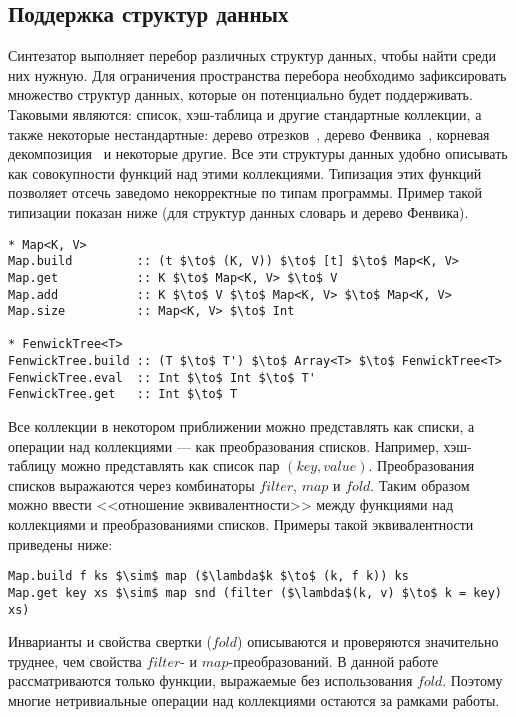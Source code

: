 \documentclass[14pt]{matmex-diploma-custom}
\begin{document}
\subsection{Поддержка структур данных}
Синтезатор выполняет перебор различных структур данных, чтобы найти среди них нужную. Для ограничения пространства перебора необходимо зафиксировать множество структур данных, которые он потенциально будет поддерживать. Таковыми являются: список, хэш-таблица и другие стандартные коллекции, а также некоторые нестандартные: дерево отрезков~\cite{Bentley1977}, дерево Фенвика~\cite{Fenwick}, корневая декомпозиция~\cite{RootDec} и некоторые другие. Все эти структуры данных удобно описывать как совокупности функций над этими коллекциями. Типизация этих функций позволяет отсечь заведомо некорректные по типам программы. Пример такой типизации показан ниже (для структур данных словарь и дерево Фенвика).

\begin{lstlisting}[language=CollectionLang, mathescape=true]
* Map<K, V>
Map.build         :: (t $\to$ (K, V)) $\to$ [t] $\to$ Map<K, V>
Map.get           :: K $\to$ Map<K, V> $\to$ V
Map.add           :: K $\to$ V $\to$ Map<K, V> $\to$ Map<K, V>
Map.size          :: Map<K, V> $\to$ Int

* FenwickTree<T>
FenwickTree.build :: (T $\to$ T') $\to$ Array<T> $\to$ FenwickTree<T> 
FenwickTree.eval  :: Int $\to$ Int $\to$ T'
FenwickTree.get   :: Int $\to$ T
\end{lstlisting}

Все коллекции в некотором приближении можно представлять как списки, а операции над коллекциями --- как преобразования списков. Например, хэш-таблицу можно представлять как список пар $(key, value)$. Преобразования списков выражаются через комбинаторы $filter$, $map$ и $fold$. Таким образом можно ввести <<отношение эквивалентности>> между функциями над коллекциями и преобразованиями списков. Примеры такой эквивалентности приведены ниже:
\begin{lstlisting}[language=CollectionLang, mathescape=true]
Map.build f ks $\sim$ map ($\lambda$k $\to$ (k, f k)) ks
Map.get key xs $\sim$ map snd (filter ($\lambda$(k, v) $\to$ k = key) xs)
\end{lstlisting}

Инварианты и свойства свертки ($fold$) описываются и проверяются значительно труднее, чем свойства $filter$- и $map$-преобразований. В данной работе рассматриваются только функции, выражаемые без использования $fold$. Поэтому многие нетривиальные операции над коллекциями остаются за рамками работы.
\end{document}
